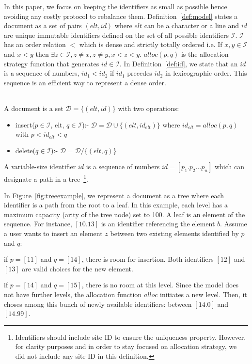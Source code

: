 In this paper, we focus on keeping the identifiers as small as possible hence
avoiding any costly protocol to rebalance them. Definition~\ref{def:model}
states a document as a set of pairs $(elt, id)$ where $elt$ can be a character
or a line and $id$ are unique immutable identifiers defined on the set of all
possible identifiers $\mathcal{I}$. $\mathcal{I}$ has an order relation $<$
which is dense and strictly totally ordered i.e. If $x,y \in \mathcal{I}$ and
$x < y$ then $\exists z \in \mathcal{I}, z\neq x, z\neq y, x < z <
y$. $alloc(p,q)$ is the allocation strategy function that generates $id \in
\mathcal{I}$. In Definition~\ref{def:id}, we state that an $id$ is a sequence
of numbers, $id_1<id_2$ if $id_1 $ precedes $id_2$ in lexicographic order. This
sequence is an efficient way to represent a dense order.

\begin{Def}\ \\
A document is a set $\mathcal{D} = \{ (elt, id) \}$ with two operations:
\begin{itemize}
  \item insert($p \in \mathcal{I}$, elt, $q \in
    \mathcal{I}$):- $\mathcal{D}=\mathcal{D} \cup \{(elt,id_{elt})\}$ where
    $id_{elt}=alloc(p,q)$ with $p<id_{elt}<q$
  \item delete($q \in \mathcal{I}$):- $\mathcal{D}=\mathcal{D}/\{(elt,q)\}$
\end{itemize}
\label{def:model}
\end{Def}

\begin{Def}
  A variable-size identifier $id$ is a sequence of numbers $id=[p_1.p_2\ldots
    p_n]$ which can designate a path in a tree~\footnote{Identifiers should
    include site ID to ensure the uniqueness property. However, for clarity
    purposes and in order to stay focused on allocation strategy, we did not
    include any site ID in this definition.}.
\label{def:id}
\end{Def}

In Figure~\ref{fig:treeexample}, we represent a document as a tree where each
identifier is a path from the root to a leaf. In this example, each level has a
maximum capacity (arity of the tree node) set to 100. A leaf is an element of
the sequence. For instance, $[10.13]$ is an identifier referencing the element
$b$.  Assume a user wants to insert an element $z$ between two existing
elements identified by $p$ and $q$:
\begin{asparaitem}
\item if $p=[11]$ and $q=[14]$, there is room for insertion. Both identifiers
  $[12]$ and $[13]$ are valid choices for the new element.
\item if $p=[14]$ and $q=[15]$, there is no room at this level. Since the model
  does not have further levels, the allocation function $alloc$ initiates a new
  level. Then, it choses among this bunch of newly available identifiers:
  between $[14.0]$ and $[14.99]$.
\end{asparaitem}

